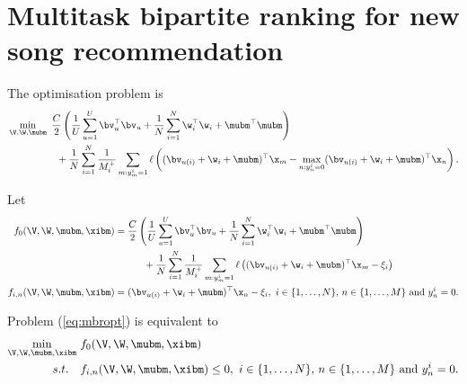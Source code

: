 \section{Multitask bipartite ranking for new song recommendation}

The optimisation problem is
\begin{equation}
\label{eq:mbropt}
\begin{aligned}
&\min_{\V, \W, \mubm} \ \frac{C}{2} \left( \frac{1}{U} \sum_{u=1}^U \bv_u^\top \bv_u 
     + \frac{1}{N} \sum_{i=1}^N \w_i^\top \w_i + \mubm^\top \mubm \right) \\
& \hspace{5em}
     + \frac{1}{N} \sum_{i=1}^N \frac{1}{M_i^+} \sum_{m: y_m^i = 1} \ell \left( (\bv_{u(i)} + \w_i + \mubm)^\top \x_m 
     - \max_{n: y_n^i = 0} (\bv_{u(i)} + \w_i + \mubm)^\top \x_n \right).
\end{aligned}
\end{equation}

Let 
\begin{equation*}
\begin{aligned}
f_0(\V, \W, \mubm, \xibm) &= \frac{C}{2} \left( \frac{1}{U} \sum_{u=1}^U \bv_u^\top \bv_u 
     + \frac{1}{N} \sum_{i=1}^N \w_i^\top \w_i + \mubm^\top \mubm \right) \\
& \hspace{3em}
     + \frac{1}{N} \sum_{i=1}^N \frac{1}{M_i^+} \sum_{m: y_m^i = 1} 
       \ell \left( (\bv_{u(i)} + \w_i + \mubm)^\top \x_m - \xi_i \right) \\
f_{i,n} (\V, \W, \mubm, \xibm) &= (\bv_{u(i)} + \w_i + \mubm)^\top \x_n - \xi_i, \
i \in \{1,\dots,N\}, \, n \in \{1,\dots,M\} \ \mathrm{and} \ y_n^i = 0.
\end{aligned}
\end{equation*}

Problem (\ref{eq:mbropt}) is equivalent to 
\begin{equation}
\label{eq:stdopt}
\begin{aligned}
\min_{\V, \W, \mubm, \xibm} \ & f_0(\V, \W, \mubm, \xibm) \\
s.t. \quad & f_{i,n}(\V, \W, \mubm, \xibm) \le 0, \
i \in \{1,\dots,N\}, \, n \in \{1,\dots,M\} \ \mathrm{and} \ y_n^i = 0.
\end{aligned}
\end{equation}

